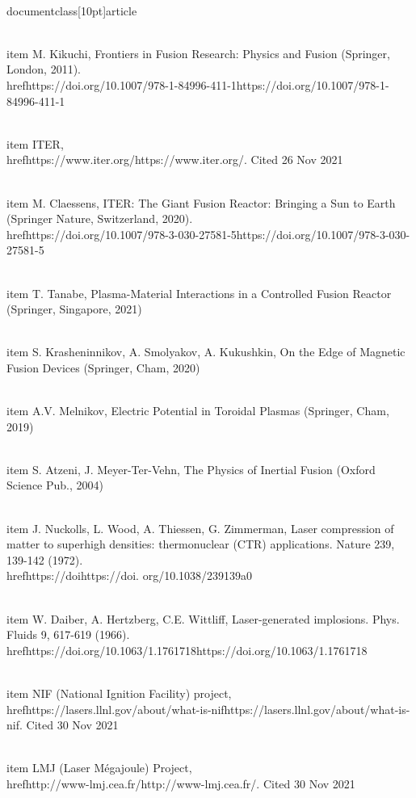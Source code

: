 \\documentclass[10pt]{article}
\begin{document}
{{{{{{  \\item M. Kikuchi, Frontiers in Fusion Research: Physics and Fusion (Springer, London, 2011). \\href{https://doi.org/10.1007/978-1-84996-411-1}{https://doi.org/10.1007/978-1-84996-411-1}

  \\item ITER, \\href{https://www.iter.org/}{https://www.iter.org/}. Cited 26 Nov 2021

  \\item M. Claessens, ITER: The Giant Fusion Reactor: Bringing a Sun to Earth (Springer Nature, Switzerland, 2020). \\href{https://doi.org/10.1007/978-3-030-27581-5}{https://doi.org/10.1007/978-3-030-27581-5}

  \\item T. Tanabe, Plasma-Material Interactions in a Controlled Fusion Reactor (Springer, Singapore, 2021)

  \\item S. Krasheninnikov, A. Smolyakov, A. Kukushkin, On the Edge of Magnetic Fusion Devices (Springer, Cham, 2020)

  \\item A.V. Melnikov, Electric Potential in Toroidal Plasmas (Springer, Cham, 2019)

  \\item S. Atzeni, J. Meyer-Ter-Vehn, The Physics of Inertial Fusion (Oxford Science Pub., 2004)

  \\item J. Nuckolls, L. Wood, A. Thiessen, G. Zimmerman, Laser compression of matter to superhigh densities: thermonuclear (CTR) applications. Nature 239, 139-142 (1972). \\href{https://doi}{https://doi}. org/10.1038/239139a0

  \\item W. Daiber, A. Hertzberg, C.E. Wittliff, Laser-generated implosions. Phys. Fluids 9, 617-619 (1966). \\href{https://doi.org/10.1063/1.1761718}{https://doi.org/10.1063/1.1761718}

  \\item NIF (National Ignition Facility) project, \\href{https://lasers.llnl.gov/about/what-is-nif}{https://lasers.llnl.gov/about/what-is-nif}. Cited 30 Nov 2021

  \\item LMJ (Laser Mégajoule) Project, \\href{http://www-lmj.cea.fr/}{http://www-lmj.cea.fr/}. Cited 30 Nov 2021

}}}}}}
\end{document}
